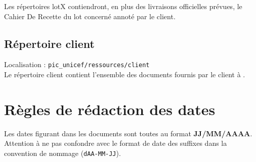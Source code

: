 Les répertoires lotX contiendront, en plus des livraisons officielles prévues, le Cahier De Recette du lot concerné annoté par le client.

\subsection{Répertoire client}

Localisation : \verb+pic_unicef/ressources/client+\\

Le répertoire client contient l’ensemble des documents fournis par le client à \nomEquipe.

\section{Règles de rédaction des dates}

Les dates figurant dans les documents sont toutes au format \textbf{JJ/MM/AAAA}. Attention à ne pas confondre avec le format de date des  suffixes dans la convention de nommage (\verb+dAA-MM-JJ+).

